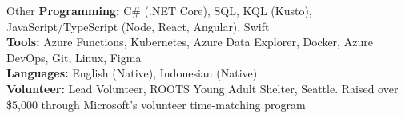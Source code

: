 \documentclass{resume} %
\begin{document}

\begin{rSection}{Other}
    \textbf{Programming:} C\# (.NET Core), SQL, KQL (Kusto), JavaScript/TypeScript (Node, React, Angular), Swift
    \\ \textbf{Tools:} Azure Functions, Kubernetes, Azure Data Explorer, Docker, Azure DevOps, Git, Linux, Figma
    \\ \textbf{Languages:} English (Native), Indonesian (Native)
    \\ \textbf{Volunteer:} Lead Volunteer, ROOTS Young Adult Shelter, Seattle. Raised over \$5,000 through Microsoft's volunteer time-matching program
\end{rSection}
\end{document}
